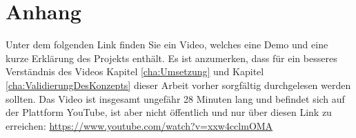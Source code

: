 \chapter*{Anhang} \label{cha:Anhang}

Unter dem folgenden Link finden Sie ein Video, welches eine Demo und eine kurze Erklärung des Projekts enthält. Es ist anzumerken, dass für ein besseres Verständnis des Videos Kapitel \ref{cha:Umsetzung} und Kapitel \ref{cha:ValidierungDesKonzepts} dieser Arbeit vorher sorgfältig durchgelesen werden sollten. Das Video ist insgesamt ungefähr 28 Minuten lang und befindet sich auf der Plattform YouTube, ist aber nicht öffentlich und nur über diesen Link zu erreichen:
\newline\newline
\url{https://www.youtube.com/watch?v=xxw4cclmOMA}
